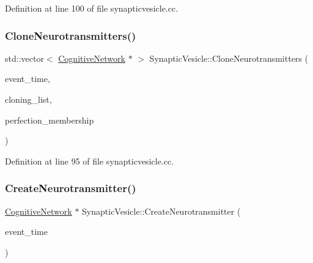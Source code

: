 Definition at line 100 of file synapticvesicle.\+cc.

\mbox{\label{class_synaptic_vesicle_aa610e38786a8c9978d9c00bca40a5200}} 
\subsubsection{\texorpdfstring{Clone\+Neurotransmitters()}{CloneNeurotransmitters()}}
{\footnotesize\ttfamily std\+::vector$<$ \mbox{\hyperlink{class_cognitive_network}{Cognitive\+Network}} $\ast$ $>$ Synaptic\+Vesicle\+::\+Clone\+Neurotransmitters (\begin{DoxyParamCaption}\item[{std\+::chrono\+::time\+\_\+point$<$ \mbox{\hyperlink{universe_8h_a0ef8d951d1ca5ab3cfaf7ab4c7a6fd80}{Clock}} $>$}]{event\+\_\+time,  }\item[{std\+::vector$<$ \mbox{\hyperlink{class_cognitive_network}{Cognitive\+Network}} $\ast$$>$}]{cloning\+\_\+list,  }\item[{double}]{perfection\+\_\+membership }\end{DoxyParamCaption})}



Definition at line 95 of file synapticvesicle.\+cc.

\mbox{\label{class_synaptic_vesicle_a89f4fd3ed27a7dc768de215534325d6a}} 
\subsubsection{\texorpdfstring{Create\+Neurotransmitter()}{CreateNeurotransmitter()}}
{\footnotesize\ttfamily \mbox{\hyperlink{class_cognitive_network}{Cognitive\+Network}} $\ast$ Synaptic\+Vesicle\+::\+Create\+Neurotransmitter (\begin{DoxyParamCaption}\item[{std\+::chrono\+::time\+\_\+point$<$ \mbox{\hyperlink{universe_8h_a0ef8d951d1ca5ab3cfaf7ab4c7a6fd80}{Clock}} $>$}]{event\+\_\+time }\end{DoxyParamCaption})}



